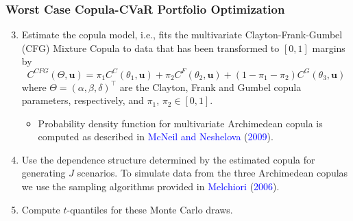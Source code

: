 \documentclass[pdf,10pt,xcolor=dvipsnames,hide notes]{beamer}
\begin{document}
\begin{frame}[label=frame5b]
	\frametitle{Worst Case Copula-CVaR Portfolio Optimization}
	
	\setlength{\parskip}{15pt}
	
	\begin{enumerate}
		\setcounter{enumi}{2}
		\justifying
		\item Estimate the copula model, i.e., fits the multivariate Clayton-Frank-Gumbel
		(CFG) Mixture Copula to data that has been transformed to $[0,1]$ margins by
		\begin{equation}
		C^{CFG}( \Theta ,\mathbf{u}) =\pi _{1}C^{C}( \theta _{1},\mathbf{u}) +\pi
		_{2}C^{F}( \theta_{2},\mathbf{u}) +(1-\pi _{1}-\pi _{2}) C^{G}( \theta _{3},%
		\mathbf{u})
		\end{equation}
		where $\Theta=\left(\alpha,\beta,\delta\right)^{\top }$ are the Clayton,
		Frank and Gumbel copula parameters, respectively, and $\pi_{1}$, $\pi_{2}
		\in [0,1]$. 
		\setlength{\parskip}{5pt}
		\begin{itemize}
			\item Probability density function for multivariate Archimedean copula is computed as described in \textcolor{blue}{McNeil and Neshelova} (\textcolor{blue}{2009}).
		\end{itemize} 
		
		\setlength{\parskip}{15pt}

		\item Use the dependence structure determined by the estimated copula for generating $J $ scenarios. To simulate data from the three Archimedean copulas we use the sampling algorithms provided in \textcolor{blue}{Melchiori} (\textcolor{blue}{2006}).
		
	\item Compute $t$-quantiles for these Monte Carlo draws. 
		
		\end{enumerate}
	
\end{frame}
\end{document}
